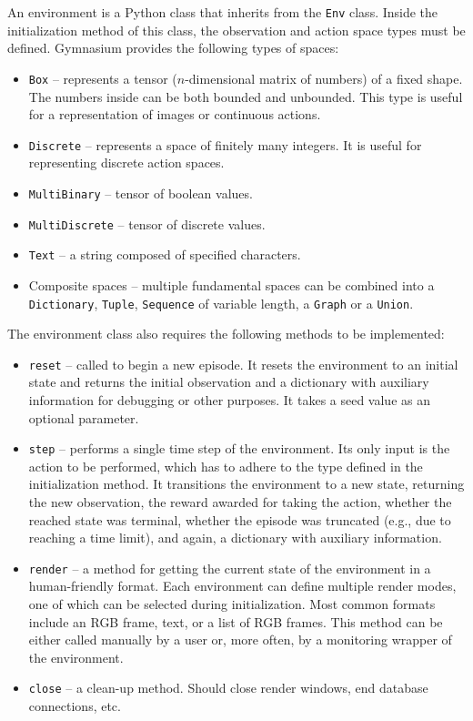 \documentclass[
  digital,     %
  oneside,     %
  nosansbold,  %
  nocolorbold, %
  lof,         %
  lot,         %
]{fithesis4}
\begin{document}
An environment is a Python class that inherits from the \texttt{Env} class. Inside the initialization method of this class, the observation and action space types must be defined. Gymnasium provides the following types of spaces:

\begin{itemize}
    \item \texttt{Box} -- represents a tensor ($n$-dimensional matrix of numbers) of a fixed shape. The numbers inside can be both bounded and unbounded. This type is useful for a representation of images or continuous actions.
    \item \texttt{Discrete} -- represents a space of finitely many integers. It is useful for representing discrete action spaces.
    \item \texttt{MultiBinary} -- tensor of boolean values.
    \item \texttt{MultiDiscrete} -- tensor of discrete values. 
    \item \texttt{Text} -- a string composed of specified characters.
    \item Composite spaces -- multiple fundamental spaces can be combined into a \texttt{Dictionary}, \texttt{Tuple}, \texttt{Sequence} of variable length, a \texttt{Graph} or a \texttt{Union}.
\end{itemize}

The environment class also requires the following methods to be implemented:

\begin{itemize}
    \item \texttt{reset} -- called to begin a new episode. It resets the environment to an initial state and returns the initial observation and a dictionary with auxiliary information for debugging or other purposes. It takes a seed value as an optional parameter.
    \item \texttt{step} -- performs a single time step of the environment. Its only input is the action to be performed, which has to adhere to the type defined in the initialization method. It transitions the environment to a new state, returning the new observation, the reward awarded for taking the action, whether the reached state was terminal, whether the episode was truncated (e.g., due to reaching a time limit), and again, a dictionary with auxiliary information.
    \item \texttt{render} -- a method for getting the current state of the environment in a human-friendly format. Each environment can define multiple render modes, one of which can be selected during initialization. Most common formats include an RGB frame, text, or a list of RGB frames. This method can be either called manually by a user or, more often, by a monitoring wrapper of the environment.
    \item \texttt{close} -- a clean-up method. Should close render windows, end database connections, etc.
\end{itemize}
\end{document}
